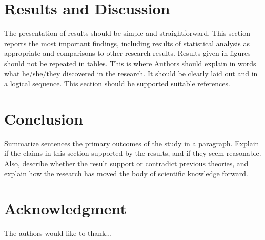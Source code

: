 \documentclass[]{indojc_single}
\begin{document}
\section{Results and Discussion}
The presentation of results should be simple and straightforward. This section reports the most important findings, including results of statistical analysis as appropriate and comparisons to other research results. Results given in figures should not be repeated in tables. This is where Authors should explain in words what he/she/they discovered in the research. It should be clearly laid out and in a logical sequence. This section should be supported suitable references.

\section{Conclusion}
Summarize sentences the primary outcomes of the study in a paragraph. Explain if the claims in this section supported by the results, and if they seem reasonable. Also, describe whether the result support or contradict previous theories, and explain how the research has moved the body of scientific knowledge forward.

\section*{Acknowledgment}
The authors would like to thank...


{}

%
%
\end{document}
